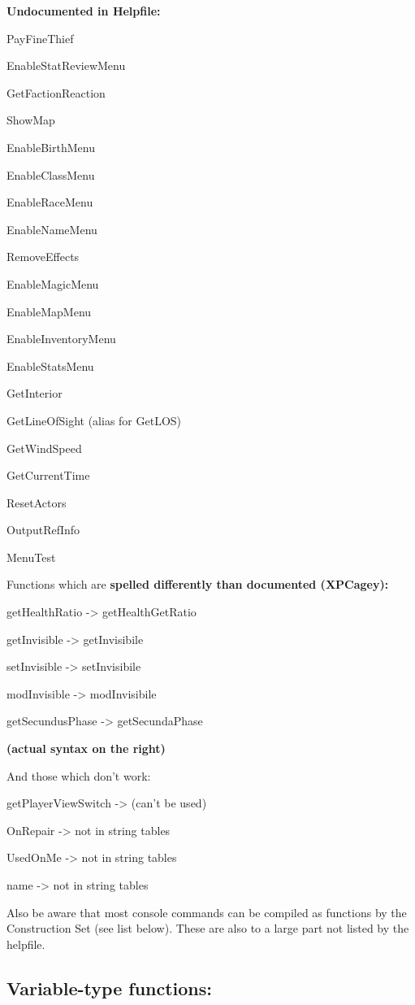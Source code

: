 \textbf{Undocumented in Helpfile:}

PayFineThief

EnableStatReviewMenu

GetFactionReaction

ShowMap

EnableBirthMenu

EnableClassMenu

EnableRaceMenu

EnableNameMenu

RemoveEffects

EnableMagicMenu

EnableMapMenu

EnableInventoryMenu

EnableStatsMenu

GetInterior

GetLineOfSight (alias for GetLOS)

GetWindSpeed

GetCurrentTime

ResetActors

OutputRefInfo

MenuTest

Functions which are \textbf{spelled differently than documented
(XPCagey):}

getHealthRatio -> getHealthGetRatio

getInvisible -> getInvisibile

setInvisible -> setInvisibile

modInvisible -> modInvisibile

getSecundusPhase -> getSecundaPhase

\textbf{(actual syntax on the right)}

And those which don't work:

getPlayerViewSwitch -> (can't be used)

OnRepair -> not in string tables

UsedOnMe -> not in string tables

name -> not in string tables

Also be aware that most console commands can be compiled as functions by
the Construction Set (see list below). These are also to a large part
not listed by the helpfile.

\hypertarget{variable-type-functions}{%
\subsection{\texorpdfstring{\hfill\break
Variable-type
functions:}{ Variable-type functions:}}\label{variable-type-functions}}

